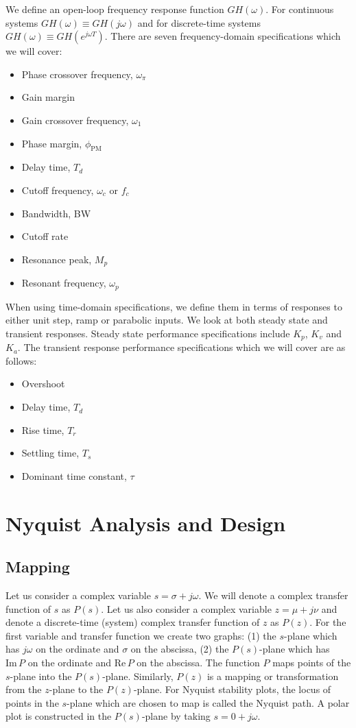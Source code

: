 \documentclass[11pt]{book}
\theoremstyle{example}
\begin{document}
We define an open-loop frequency response function $GH(\omega)$. For continuous systems $GH(\omega)\equiv{GH(j\omega)}$ and for discrete-time systems $GH(\omega)\equiv{GH(e^{j\omega{T}})}$. There are seven frequency-domain specifications which we will cover:
\begin{itemize}
	\item Phase crossover frequency, $\omega_\pi$
	\item Gain margin
	\item Gain crossover frequency, $\omega_\mathrm{1}$
	\item Phase margin, $\phi_\mathrm{PM}$
	\item Delay time, $T_d$
	\item Cutoff frequency, $\omega_c$ or $f_c$
	\item Bandwidth, BW
	\item Cutoff rate
	\item Resonance peak, $M_p$
	\item Resonant frequency, $\omega_p$
\end{itemize}

When using time-domain specifications, we define them in terms of responses to either unit step, ramp or parabolic inputs. We look at both steady state and transient responses. Steady state performance specifications include $K_p$, $K_v$ and $K_a$. The transient response performance specifications which we will cover are as follows:
\begin{itemize}
	\item Overshoot
	\item Delay time, $T_d$
	\item Rise time, $T_r$
	\item Settling time, $T_s$
	\item Dominant time constant, $\tau$
\end{itemize}

\section{Nyquist Analysis and Design}

\subsection{Mapping}

Let us consider a complex variable $s=\sigma+j\omega$. We will denote a complex transfer function of $s$ as $P(s)$. Let us also consider a complex variable $z=\mu+j\nu$ and denote a discrete-time (system) complex transfer function of $z$  as $P(z)$. For the first variable and transfer function we create two graphs: (1) the $s$-plane which has $j\omega$ on the ordinate and $\sigma$ on the abscissa, (2) the $P(s)$-plane which has $\mathrm{Im}\,P$ on the ordinate and $\mathrm{Re}\,P$ on the abscissa. The function $P$ maps points of the $s$-plane into the $P(s)$-plane. Similarly, $P(z)$ is a mapping or transformation from the $z$-plane to the $P(z)$-plane. For Nyquist stability plots, the locus of points in the $s$-plane which are chosen to map is called the Nyquist path. A polar plot is constructed in the $P(s)$-plane by taking $s=0+j\omega$.  
\end{document}
